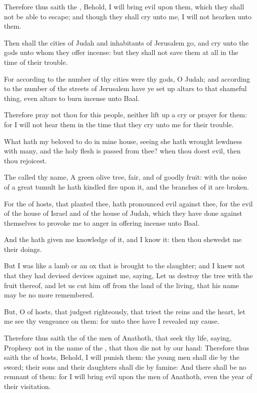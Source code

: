 \verse Therefore thus saith the \LORD, Behold, I will bring evil upon them, which they shall not be able to escape; and though they shall cry unto me, I will not hearken unto them.

\verse Then shall the cities of Judah and inhabitants of Jerusalem go, and cry unto the gods unto whom they offer incense: but they shall not save them at all in the time of their trouble.

\verse For according to the number of thy cities were thy gods, O Judah; and according to the number of the streets of Jerusalem have ye set up altars to that shameful thing, even altars to burn incense unto Baal.

\verse Therefore pray not thou for this people, neither lift up a cry or prayer for them: for I will not hear them in the time that they cry unto me for their trouble.

\verse What hath my beloved to do in mine house, seeing she hath wrought lewdness with many, and the holy flesh is passed from thee?  when thou doest evil, then thou rejoicest.

\verse The \LORD called thy name, A green olive tree, fair, and of goodly fruit: with the noise of a great tumult he hath kindled fire upon it, and the branches of it are broken.

\verse For the \LORD of hosts, that planted thee, hath pronounced evil against thee, for the evil of the house of Israel and of the house of Judah, which they have done against themselves to provoke me to anger in offering incense unto Baal.

\verse And the \LORD hath given me knowledge of it, and I know it: then thou shewedst me their doings.

\verse But I was like a lamb or an ox that is brought to the slaughter; and I knew not that they had devised devices against me, saying, Let us destroy the tree with the fruit thereof, and let us cut him off from the land of the living, that his name may be no more remembered.

\verse But, O \LORD of hosts, that judgest righteously, that triest the reins and the heart, let me see thy vengeance on them: for unto thee have I revealed my cause.

\verse Therefore thus saith the \LORD of the men of Anathoth, that seek thy life, saying, Prophesy not in the name of the \LORD, that thou die not by our hand: \verse Therefore thus saith the \LORD of hosts, Behold, I will punish them: the young men shall die by the sword; their sons and their daughters shall die by famine: \verse And there shall be no remnant of them: for I will bring evil upon the men of Anathoth, even the year of their visitation.


